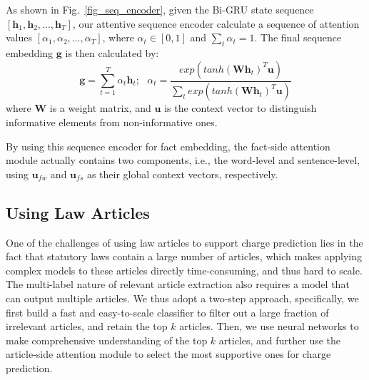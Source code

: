 As shown in Fig.~\ref{fig_seq_encoder}, given the Bi-GRU state sequence $[\mathbf{h}_1, \mathbf{h}_2, ..., \mathbf{h}_T]$, 
our attentive sequence encoder calculate a sequence of attention values $[\alpha_1, \alpha_2, ..., \alpha_T]$, 
where $\alpha_t \in [0, 1]$ and $\sum_t{\alpha_t}=1$. The final sequence embedding $\mathbf{g}$ is then calculated by:
% 
\begin{equation}
\mathbf{g} = \sum_{t=1}^{T}{\alpha_t \mathbf{h}_t};\ \ \ 
\alpha_t=\frac{exp(tanh(\mathbf{W} \mathbf{h}_t)^T \mathbf{u})}{\sum_t{exp(tanh(\mathbf{W} \mathbf{h}_t)^T \mathbf{u})}}
\label{seq_embed}
\end{equation}
where $\mathbf{W}$ is a weight matrix, and $\mathbf{u}$ is the context vector to distinguish informative elements from non-informative ones. 

By using this sequence encoder for fact embedding, the fact-side attention module actually contains two components, i.e., the word-level and sentence-level, using $\mathbf{u}_{fw}$ and $\mathbf{u}_{fs}$ as their global context vectors, respectively.


\subsection{Using Law Articles} 
One of the challenges of using law articles to support charge prediction lies in the fact that statutory laws contain a large number of articles, which makes applying complex models to these articles directly time-consuming, and thus hard to scale.
The multi-label nature of relevant article extraction also requires a model that can output multiple articles.
%
We thus adopt a two-step approach, %
specifically, we first build a fast and easy-to-scale classifier to filter out a large fraction of irrelevant articles, and retain the top $k$ articles. Then, we use neural networks to make comprehensive understanding of the top $k$ articles, and further use the article-side attention module to select the most supportive ones for charge prediction.

